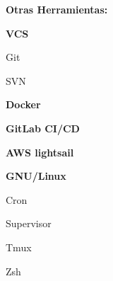\begin{itemize}
\begin{itemize*}
    \end{itemize*}
\item
    \textbf{Otras Herramientas:}
    \begin{itemize*}
        \item \textbf{VCS}
            \begin{itemize*}
                \item Git
                \item SVN
            \end{itemize*}
        \item \textbf{Docker}
        \item \textbf{GitLab CI/CD}
        \item \textbf{AWS lightsail}
        \item \textbf{GNU/Linux}
        \begin{itemize*}
            \item Cron
            \item Supervisor
            \item Tmux
            \item Zsh
        \end{itemize*}
    \end{itemize*}
\end{itemize}
